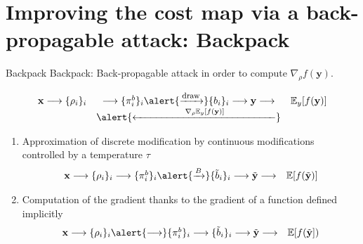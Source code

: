 \documentclass[10pt]{beamer}
\begin{document}
\section{Improving the cost map via a back-propagable attack: Backpack}


\begin{frame}{Backpack}
\alert{Backpack}: \alert{Back-p}ropagable att\alert{ack} \pause in order to compute \alert{$\nabla_{\rho} f(\mathbf{y})$}.

    \begin{equation*}
    \begin{array}{ccccccccccc}
        \mathbf{x} \longrightarrow \{\rho_i\}_i & \longrightarrow  \{\pi_i^b\}_i    \alert{\xrightarrow{\mbox{\footnotesize{draw}}}}  \{b_i\}_i   \longrightarrow  \mathbf{y}  \longrightarrow  & \mathbb{E}_{y} [f(\mathbf{y})] \\ 
        & \alert{\xleftarrow{\hspace{5em} \nabla_\rho \mathbb{E}_{y} [f(\mathbf{y})]\hspace{5em}}} 
    \end{array}
    \end{equation*}
        
    \pause
   \begin{enumerate}
       \item Approximation of discrete modification by continuous modifications controlled by a temperature $\tau$ 
       \begin{equation*}
    \begin{array}{ccccccccccc}
        \mathbf{x} \longrightarrow \{\rho_i\}_i \longrightarrow  \{\pi_i^b\}_i    \alert{\xrightarrow{B} } \{\tilde{b}_i\}_i   \longrightarrow  \tilde{\mathbf{y}}  \longrightarrow  & \mathbb{E}[f(\tilde{\mathbf{y}})]
    \end{array}
    \end{equation*}
    
        \pause
       \item Computation of the gradient thanks to the gradient of a function defined implicitly
         \begin{equation*}
    \begin{array}{ccccccccccc}
        \mathbf{x} \longrightarrow \{\rho_i\}_i \alert{\longrightarrow}  \{\pi_i^b\}_i    \longrightarrow \{\tilde{b}_i\}_i \longrightarrow  \tilde{\mathbf{y}}  \longrightarrow  & \mathbb{E}[f(\tilde{\mathbf{y}}])
    \end{array}
    \end{equation*}
   \end{enumerate}
\end{frame}
\end{document}

